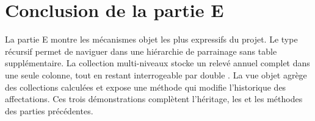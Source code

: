 \section{Conclusion de la partie E}

La partie E montre les mécanismes objet les plus expressifs du projet. Le type
récursif permet de naviguer dans une hiérarchie de parrainage sans table
supplémentaire. La collection multi-niveaux stocke un relevé annuel complet
dans une seule colonne, tout en restant interrogeable par double
. La vue objet agrège des collections calculées et expose une
méthode qui modifie l'historique des affectations. Ces trois démonstrations
complètent l'héritage, les  et les méthodes des parties précédentes.
